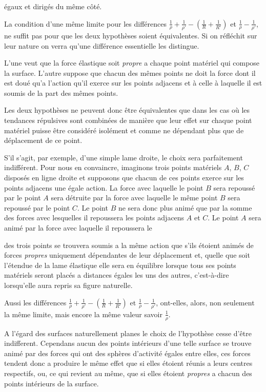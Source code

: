 \documentclass[11pt,a4paper]{article}
\begin{document}
égaux et dirigés du même côté.

La condition d'une même limite pour les différences
$\frac{1}{\rho} + \frac{1}{\rho'} - \left( \frac{1}{R} + \frac{1}{R'} \right)$
et $\frac{1}{\rho} - \frac{1}{\rho'}$, ne suffit pas pour que les deux
hypothèses soient équivalentes. Si on réfléchit sur leur nature on verra
qu'une différence essentielle les distingue.

L'une veut que la force élastique soit \emph{propre} a chaque point matériel
qui compose la surface. L'autre suppose que chacun des mêmes points ne doit la
force dont il est doué qu'a l'action qu'il exerce sur les points adjacens et à
celle à laquelle il est soumis de la part des mêmes points.

Les deux hypothèses ne peuvent donc être équivalentes que dans les cas où les
tendances répulsives sont combinées de manière que leur effet sur chaque point
matériel puisse être considéré isolément et comme ne dépendant plus que de
 déplacement de ce point.

S'il s'agit, par exemple, d'une simple lame droite, le choix
 sera parfaitement indifférent.
Pour nous en convaincre, imaginons trois points matériels $A$, $B$, $C$
disposés en ligne droite et supposons que chacun de ces points exerce sur les
points adjacens une égale action. La force avec laquelle le point $B$ sera
repoussé par le point $A$ sera détruite par la force avec laquelle le même
point $B$ sera repoussé par le point $C$. Le point $B$ ne sera donc plus animé
que par la somme des forces avec lesquelles il repoussera les points adjacens
$A$ et $C$. Le point $A$ sera animé par la force avec laquelle il repoussera le

des trois points se trouvera soumis a la même action que s'ils étoient animés
de forces \emph{propres} uniquement dépendantes de leur déplacement et, quelle
que soit l'étendue de la lame élastique elle sera en équilibre lorsque tous
ses points matériels seront placés a distances égales les uns des autres,
c'est-à-dire lorsqu'elle aura repris sa figure naturelle.

Aussi les différences
$\frac{1}{\rho} + \frac{1}{\rho'} - \left( \frac{1}{R} + \frac{1}{R'} \right)$
et $\frac{1}{\rho} - \frac{1}{\rho'}$, ont-elles, alors, non seulement la même
limite, mais encore la même valeur savoir $\frac{1}{\rho}$.

A l'égard des surfaces naturellement planes le choix de l'hypothèse cesse
d'être indifferent. Cependans aucun des points intérieurs d'une telle surface
se trouve animé par des forces qui ont des sphères d'activité égales entre
elles, ces forces tendent donc a produire le même effet que si elles étoient
réunis a leurs centres respectifs, ou, ce qui revient au même, que si elles
étoient \emph{propres} a chacun des points intérieurs de la surface.
\end{document}
